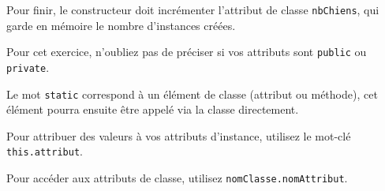 \begin{Exercice}[10 minutes]
    Pour finir, le constructeur doit incrémenter l'attribut de classe \lstinline{nbChiens}, qui garde en mémoire le nombre d'instances créées.
   	
\begin{conseil}

   Pour cet exercice, n'oubliez pas de préciser si vos attributs sont \lstinline{public} ou \lstinline{private}.
   
   Le mot \lstinline{static} correspond à un élément de classe (attribut ou méthode), cet élément pourra ensuite être appelé via la classe directement.
   
   Pour attribuer des valeurs à vos attributs d'instance, utilisez le mot-clé \lstinline{this.attribut}.
   
   Pour accéder aux attributs de classe, utilisez \lstinline{nomClasse.nomAttribut}.
\end{conseil}
    
\begin{solution}
	
\end{solution}
\end{Exercice}

